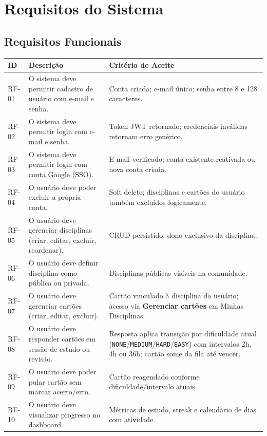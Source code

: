 \chapter{Requisitos do Sistema}
\label{cap:requisitos}

\section{Requisitos Funcionais}

\begin{quadro}[htb]
\caption{Matriz de Requisitos Funcionais}
\label{quad:rf}
\begin{tabular}{p{1.2cm}p{5.5cm}p{5.5cm}}
\toprule
\textbf{ID} & \textbf{Descrição} & \textbf{Critério de Aceite} \\
\midrule
RF-01 & O sistema deve permitir cadastro de usuário com e-mail e senha. & Conta criada; e-mail único; senha entre 8 e 128 caracteres. \\
RF-02 & O sistema deve permitir login com e-mail e senha. & Token JWT retornado; credenciais inválidas retornam erro genérico. \\
RF-03 & O sistema deve permitir login com conta Google (SSO). & E-mail verificado; conta existente reativada ou nova conta criada. \\
RF-04 & O usuário deve poder excluir a própria conta. & Soft delete; disciplinas e cartões do usuário também excluídos logicamente. \\
RF-05 & O usuário deve gerenciar disciplinas (criar, editar, excluir, reordenar). & CRUD persistido; dono exclusivo da disciplina. \\
RF-06 & O usuário deve definir disciplina como pública ou privada. & Disciplinas públicas visíveis na comunidade. \\
RF-07 & O usuário deve gerenciar cartões (criar, editar, excluir). & Cartão vinculado à disciplina do usuário; acesso via \textbf{Gerenciar cartões} em Minhas Disciplinas. \\
RF-08 & O usuário deve responder cartões em sessão de estudo ou revisão. & Resposta aplica transição por dificuldade atual (\texttt{NONE}/\texttt{MEDIUM}/\texttt{HARD}/\texttt{EASY}) com intervalos 2h, 4h ou 36h; cartão some da fila até vencer. \\
RF-09 & O usuário deve poder pular cartão sem marcar acerto/erro. & Cartão reagendado conforme dificuldade/intervalo atuais. \\
RF-10 & O usuário deve visualizar progresso no dashboard. & Métricas de estudo, streak e calendário de dias com atividade. \\

\end{tabular}
\end{quadro}

